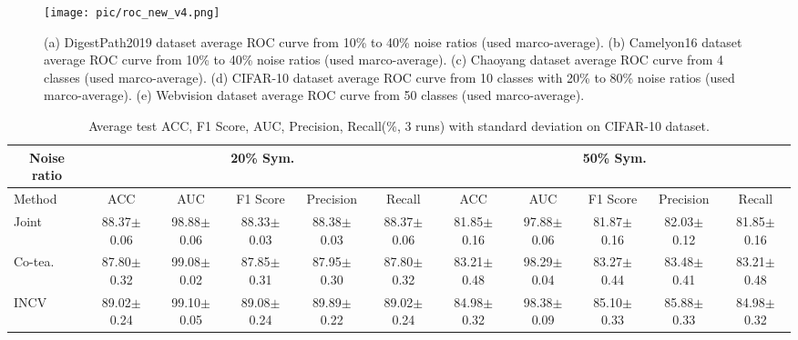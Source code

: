 \begin{figure}[]
  \centering
  \texttt{[image: pic/roc\_new\_v4.png]}
\caption{{(a) DigestPath2019 dataset average {ROC} curve from 10\% to 40\% noise ratios (used marco-average). (b) Camelyon16 dataset average {ROC} curve from 10\% to 40\% noise ratios (used marco-average). (c) Chaoyang dataset average {ROC} curve from 4 classes (used marco-average). (d) CIFAR-10 dataset average {ROC} curve from 10 classes with 20\% to 80\% noise ratios (used marco-average). (e) Webvision dataset average {ROC} curve from 50 classes (used marco-average).}}
  \label{fig:roc}
\end{figure}

\begin{table*}[]
\scriptsize
\centering
\caption{{Average test ACC, F1 Score, AUC, {Precision}, Recall(\%, 3 runs) with standard deviation on CIFAR-10 dataset.}}
\label{table:objCIFAR}
\begin{tabular}{@{}lcccccccccc@{}}
\toprule
\multicolumn{1}{c}{Noise ratio} & \multicolumn{5}{c}{20\% Sym.}                                                                                    & \multicolumn{5}{c}{50\% Sym.}                                                                                    \\ \midrule
Method                & ACC                  & AUC                  & F1 Score             & {Precision}                  & Recall               & ACC                  & AUC                  & F1 Score             & {Precision}                  & Recall               \\ \midrule
Joint                     & 88.37$\pm$0.06          & 98.88$\pm$0.06          & 88.33$\pm$0.03          & 88.38$\pm$0.03          & 88.37$\pm$0.06          & 81.85$\pm$0.16          & 97.88$\pm$0.06          & 81.87$\pm$0.16          & 82.03$\pm$0.12          & 81.85$\pm$0.16          \\
Co-tea.                     & 87.80$\pm$0.32           & 99.08$\pm$0.02          & 87.85$\pm$0.31          & 87.95$\pm$0.30          & 87.80$\pm$0.32           & 83.21$\pm$0.48          & 98.29$\pm$0.04          & 83.27$\pm$0.44          & 83.48$\pm$0.41          & 83.21$\pm$0.48          \\
INCV                            & 89.02$\pm$0.24          & 99.10$\pm$0.05           & 89.08$\pm$0.24          & 89.89$\pm$0.22          & 89.02$\pm$0.24          & 84.98$\pm$0.32          & 98.38$\pm$0.09          & 85.10$\pm$0.33           & 85.88$\pm$0.33          & 84.98$\pm$0.32          \\

\end{tabular}
\end{table*}
